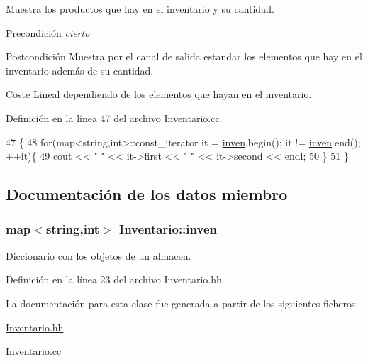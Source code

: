 Muestra los productos que hay en el inventario y su cantidad. 

\begin{DoxyPrecond}{Precondición}
{\itshape cierto} 
\end{DoxyPrecond}
\begin{DoxyPostcond}{Postcondición}
Muestra por el canal de salida estandar los elementos que hay en el inventario además de su cantidad. 
\end{DoxyPostcond}
\begin{DoxyParagraph}{Coste}
Lineal dependiendo de los elementos que hayan en el inventario. 
\end{DoxyParagraph}


Definición en la línea 47 del archivo Inventario.\+cc.


\begin{DoxyCode}
47                                       \{
48     \textcolor{keywordflow}{for}(map<string,int>::const\_iterator it = \hyperlink{class_inventario_a0359598d60117ae9b9cb5540c1a5b45f}{inven}.begin(); it != \hyperlink{class_inventario_a0359598d60117ae9b9cb5540c1a5b45f}{inven}.end(); ++it)\{
49         cout << \textcolor{stringliteral}{"  "} << it->first << \textcolor{stringliteral}{" "} << it->second << endl;
50     \}
51 \}
\end{DoxyCode}


\subsection{Documentación de los datos miembro}
\subsubsection[{\texorpdfstring{inven}{inven}}]{\setlength{\rightskip}{0pt plus 5cm}map$<$string,int$>$ Inventario\+::inven\hspace{0.3cm}{\ttfamily [private]}}\hypertarget{class_inventario_a0359598d60117ae9b9cb5540c1a5b45f}{}\label{class_inventario_a0359598d60117ae9b9cb5540c1a5b45f}


Diccionario con los objetos de un almacen. 



Definición en la línea 23 del archivo Inventario.\+hh.



La documentación para esta clase fue generada a partir de los siguientes ficheros\+:\begin{DoxyCompactItemize}
\item 
\hyperlink{_inventario_8hh}{Inventario.\+hh}\item 
\hyperlink{_inventario_8cc}{Inventario.\+cc}\end{DoxyCompactItemize}
